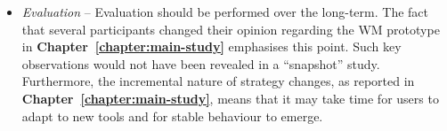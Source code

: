 \begin{itemize}
\item \textit{Evaluation} -- Evaluation should be performed over the long-term.  The fact that several participants changed their opinion regarding the WM prototype in \textbf{Chapter~\ref{chapter:main-study}} emphasises this point.  Such key observations would not have been revealed in a ``snapshot'' study.  Furthermore, the incremental nature of strategy changes, as reported in \textbf{Chapter~\ref{chapter:main-study}}, means that it may take time for users to adapt to new tools and for stable behaviour to emerge.  %

\end{itemize}





